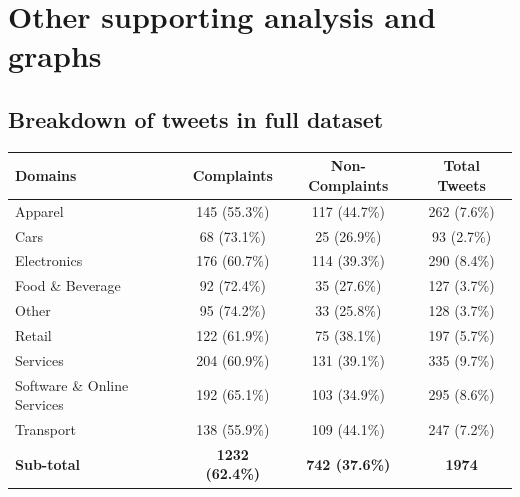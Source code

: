\chapter{Other supporting analysis and graphs}

\section{Breakdown of tweets in full dataset}
\label{sec: apdxa_fulldataset}
\begin{table}[ht]
    \captionsetup{font=small}
    \small
    \centering
    \begin{tabularx}{\textwidth}{|X|c|c|c|}
        \hline
        \rowcolor[gray]{0.7}
        \textbf{Domains}            & \textbf{Complaints}            & \textbf{Non-Complaints}        & \textbf{Total Tweets} \\
        \hline
        Apparel                     & 145 \small{(55.3\%)}           & 117 \small{(44.7\%)}           & 262 \small{(7.6\%)}   \\
        \hline
        Cars                        & 68 \small{(73.1\%)}            & 25 \small{(26.9\%)}            & 93 \small{(2.7\%)}    \\
        \hline
        Electronics                 & 176 \small{(60.7\%)}           & 114 \small{(39.3\%)}           & 290 \small{(8.4\%)}   \\
        \hline
        Food \& Beverage            & 92 \small{(72.4\%)}            & 35 \small{(27.6\%)}            & 127 \small{(3.7\%)}   \\
        \hline
        Other                       & 95 \small{(74.2\%)}            & 33 \small{(25.8\%)}            & 128 \small{(3.7\%)}   \\
        \hline
        Retail                      & 122 \small{(61.9\%)}           & 75 \small{(38.1\%)}            & 197 \small{(5.7\%)}   \\
        \hline
        Services                    & 204 \small{(60.9\%)}           & 131 \small{(39.1\%)}           & 335 \small{(9.7\%)}   \\
        \hline
        Software \& Online Services & 192 \small{(65.1\%)}           & 103 \small{(34.9\%)}           & 295 \small{(8.6\%)}   \\
        \hline
        Transport                   & 138 \small{(55.9\%)}           & 109 \small{(44.1\%)}           & 247 \small{(7.2\%)}   \\
        \hline
        \rowcolor[gray]{0.9}
        \textbf{Sub-total}          & \textbf{1232 \small{(62.4\%)}} & \textbf{742 \small{(37.6\%)}}  & \textbf{1974}         \\

\end{tabularx}
\end{table}

